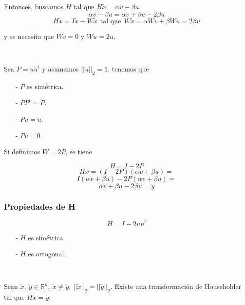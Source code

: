Entonces, buscamos $H$ tal que $H\tilde{x} = \alpha v - \beta u$
\[\alpha v - \beta u = \alpha v + \beta u - 2\beta u\]
\[H\tilde{x} = I\tilde{x} - W\tilde{x} ~~\text{tal que}~~ W\tilde{x} = \alpha Wv + \beta Wu = 2\beta u\]

y se necesita que $Wv = 0$ y $Wu = 2u$.

\

\noindent Sea $P = uu^t$ y asumamos ${||u||}_{2} = 1$, tenemos que

\begin{itemize}
    \item[-] $P$ es simétrica.
    \item[-] $PP^t = P$.
    \item[-] $Pu = u$.
    \item[-] $Pv = 0$.
\end{itemize}

\noindent Si definimos $W = 2P$, se tiene

\[H = I - 2P\]
\[H\tilde{x} = (I-2P)(\alpha v + \beta u) =\]
\[I(\alpha v + \beta u) - 2P(\alpha v + \beta u) =\]
\[\alpha v + \beta u - 2\beta u = \tilde{y}\]



\subsubsection{Propiedades de H}\label{subsubsec:householder_propiedades_h}

\[H = I - 2uu^t\]

\begin{itemize}
    \item[-] $H$ es simétrica.
    \item[-] $H$ es ortogonal.
\end{itemize}

\

\noindent Sean $\tilde{x},~\tilde{y} \in \mathbb{R}^{n},~\tilde{x} \neq \tilde{y},~{||\tilde{x}||}_{2} = {||\tilde{y}||}_{2}$. Existe una transformación de Householder tal que $H\tilde{x} = \tilde{y}$.

\

